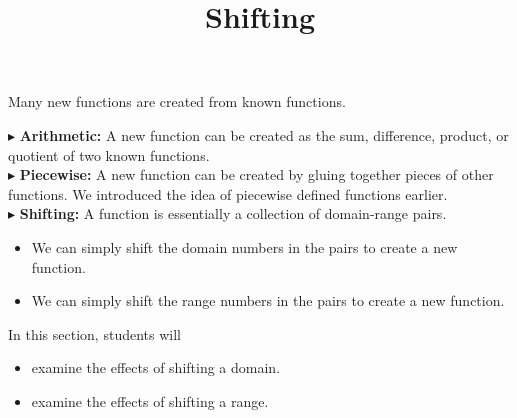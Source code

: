 \documentclass{ximera}
\title{Shifting}
\begin{document}
\begin{abstract}
\end{abstract}
\maketitle





Many new functions are created from known functions.


$\blacktriangleright$ \textbf{Arithmetic:} A new function can be created as the sum, difference, product, or quotient of two known functions. \\


$\blacktriangleright$ \textbf{Piecewise:} A new function can be created by gluing together pieces of other functions.  We introduced the idea of piecewise defined functions earlier. \\


$\blacktriangleright$ \textbf{Shifting:}  A function is essentially a collection of domain-range pairs.  


\begin{itemize}
\item We can simply shift the domain numbers in the pairs to create a new function.
\item We can simply shift the range numbers in the pairs to create a new function.
\end{itemize}







\begin{sectionOutcomes}
In this section, students will 

\begin{itemize}
\item examine the effects of shifting a domain.
\item examine the effects of shifting a range.
\end{itemize}
\end{sectionOutcomes}
\end{document}
